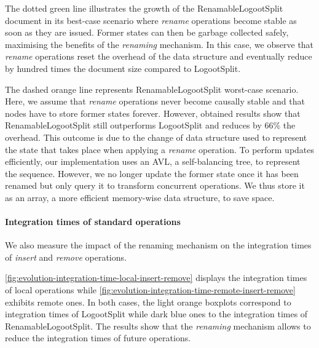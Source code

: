 \documentclass[sigplan,10pt,authorversion]{acmart}
\begin{document}
\begin{sloppypar}
The dotted green line illustrates the growth of the RenamableLogootSplit document in its best-case scenario where \emph{rename} operations become stable as soon as they are issued.
Former states can then be garbage collected safely, maximising the benefits of the \emph{renaming} mechanism.
In this case, we observe that \emph{rename} operations reset the overhead of the data structure and eventually reduce by hundred times the document size compared to LogootSplit.
\end{sloppypar}

The dashed orange line represents RenamableLogootSplit worst-case scenario.
Here, we assume that \emph{rename} operations never become causally stable and that nodes have to store former states forever.
However, obtained results show that RenamableLogootSplit still outperforms LogootSplit and reduces by 66\% the overhead.
This outcome is due to the change of data structure used to represent the state that takes place when applying a \emph{rename} operation.
To perform updates efficiently, our implementation uses an AVL, a self-balancing tree, to represent the sequence.
However, we no longer update the former state once it has been renamed but only query it to transform concurrent operations.
We thus store it as an array, a more efficient memory-wise data structure, to save space.

\paragraph{Integration times of standard operations}

We also measure the impact of the renaming mechanism on the integration times of \emph{insert} and \emph{remove} operations.

\autoref{fig:evolution-integration-time-local-insert-remove} displays the integration times of local operations while \autoref{fig:evolution-integration-time-remote-insert-remove} exhibits remote ones.
In both cases, the light orange boxplots correspond to integration times of LogootSplit while dark blue ones to the integration times of RenamableLogootSplit.
The results show that the \emph{renaming} mechanism allows to reduce the integration times of future operations.
\end{document}
